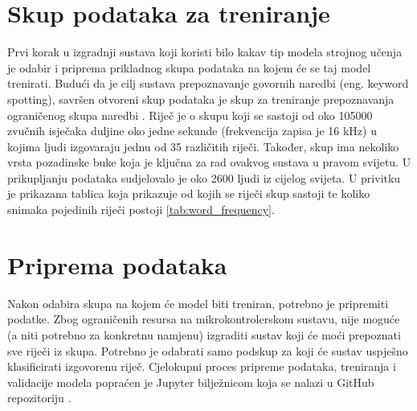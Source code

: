 \section{Skup podataka za treniranje}
\label{sec:dataset}

Prvi korak u izgradnji sustava koji koristi bilo kakav tip modela strojnog učenja
je odabir i priprema prikladnog skupa podataka na kojem će se taj model trenirati.
Budući da je cilj sustava prepoznavanje govornih naredbi (eng. keyword spotting),
savršen otvoreni skup podataka je skup za treniranje prepoznavanja ograničenog
skupa naredbi \cite{speechcommandsv2}. Riječ je o skupu koji
se sastoji od oko 105000 zvučnih isječaka duljine oko jedne sekunde (frekvencija
zapisa je 16 kHz) u kojima ljudi
izgovaraju jednu od 35 različitih riječi. Također, skup ima nekoliko vrsta 
pozadinske buke koja je ključna za rad ovakvog sustava u pravom svijetu. 
U prikupljanju podataka sudjelovalo je oko 2600 ljudi iz cijelog svijeta.
U privitku je prikazana tablica koja prikazuje od kojih se riječi skup sastoji
te koliko snimaka pojedinih riječi postoji \ref{tab:word_frequency}.


\section{Priprema podataka}
\label{sec:data}

Nakon odabira skupa na kojem će model biti treniran, potrebno je pripremiti
podatke. Zbog ograničenih resursa na mikrokontrolerskom sustavu, nije moguće
(a niti potrebno za konkretnu namjenu) izgraditi sustav koji će moći
prepoznati sve riječi iz skupa. Potrebno je odabrati samo podskup
za koji će sustav uspješno klasificirati izgovorenu riječ. Cjelokupni
proces pripreme podataka, treniranja i validacije modela popraćen je
Jupyter bilježnicom koja se nalazi u GitHub repozitoriju
\cite{balic_keyword_spotting}.

